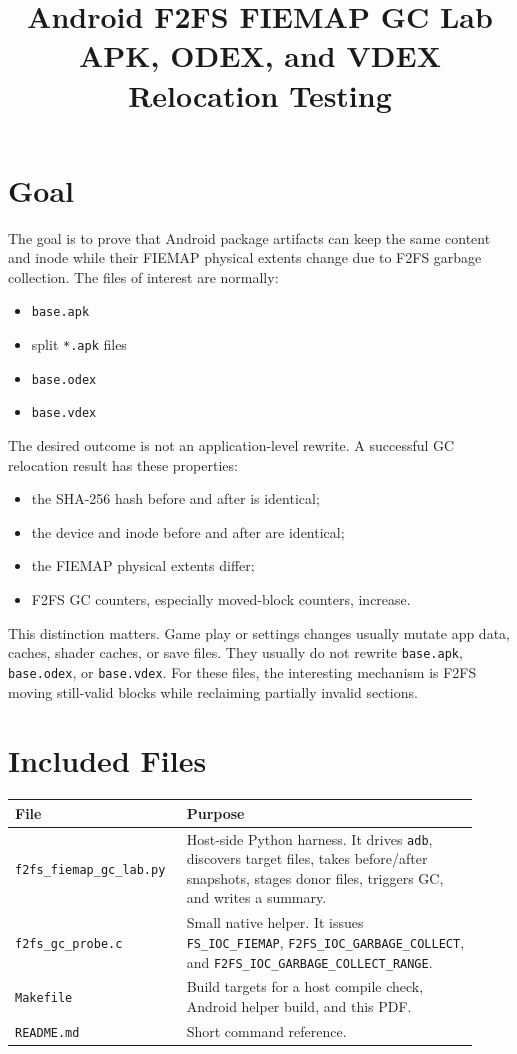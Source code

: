 \documentclass[11pt]{article}
\title{Android F2FS FIEMAP GC Lab\\APK, ODEX, and VDEX Relocation Testing}
\author{}
\date{}
\begin{document}
\maketitle

\section{Goal}

The goal is to prove that Android package artifacts can keep the same content
and inode while their FIEMAP physical extents change due to F2FS garbage
collection.  The files of interest are normally:

\begin{itemize}[nosep]
\item \texttt{base.apk}
\item split \texttt{*.apk} files
\item \texttt{base.odex}
\item \texttt{base.vdex}
\end{itemize}

The desired outcome is not an application-level rewrite.  A successful GC
relocation result has these properties:

\begin{itemize}[nosep]
\item the SHA-256 hash before and after is identical;
\item the device and inode before and after are identical;
\item the FIEMAP physical extents differ;
\item F2FS GC counters, especially moved-block counters, increase.
\end{itemize}

This distinction matters.  Game play or settings changes usually mutate app
data, caches, shader caches, or save files.  They usually do not rewrite
\texttt{base.apk}, \texttt{base.odex}, or \texttt{base.vdex}.  For these files,
the interesting mechanism is F2FS moving still-valid blocks while reclaiming
partially invalid sections.

\section{Included Files}

\begin{longtable}{p{0.32\linewidth}p{0.60\linewidth}}
\textbf{File} & \textbf{Purpose} \\
\hline
\texttt{f2fs\_fiemap\_gc\_lab.py} &
Host-side Python harness.  It drives \texttt{adb}, discovers target files,
takes before/after snapshots, stages donor files, triggers GC, and writes a
summary. \\
\texttt{f2fs\_gc\_probe.c} &
Small native helper.  It issues \texttt{FS\_IOC\_FIEMAP},
\texttt{F2FS\_IOC\_GARBAGE\_COLLECT}, and
\texttt{F2FS\_IOC\_GARBAGE\_COLLECT\_RANGE}. \\
\texttt{Makefile} &
Build targets for a host compile check, Android helper build, and this PDF. \\
\texttt{README.md} &
Short command reference. \\
\end{longtable}
\end{document}
